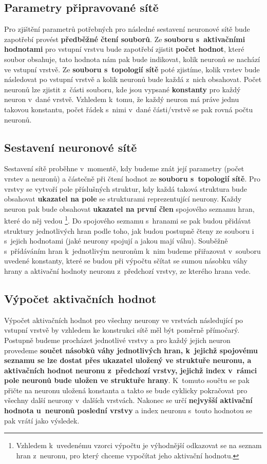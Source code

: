 \documentclass[11pt]{article}
\begin{document}
\subsection{Parametry připravované sítě}
Pro zjištění parametrů potřebných pro následné sestavení neuronové sítě bude zapotřebí provést \textbf{předběžné čtení souborů}. Ze \textbf{souboru s~aktivačními hodnotami} pro vstupní vrstvu bude zapotřebí zjistit \textbf{počet hodnot}, které soubor obsahuje, tato hodnota nám pak bude indikovat, kolik neuronů se nachází ve vstupní vrstvě. Ze \textbf{souboru s~topologií sítě} poté zjistíme, kolik vrstev bude následovat po vstupní vrstvě a kolik neuronů bude každá z~nich obsahovat. Počet neuronů lze zjistit z~části souboru, kde jsou vypsané \textbf{konstanty} pro každý neuron v~dané vrstvě. Vzhledem k~tomu, že každý neuron má práve jednu takovou konstantu, počet řádek s~nimi v~dané části/vrstvě se pak rovná počtu neuronů.

\subsection{Sestavení neuronové sítě}
Sestavení sítě proběhne v~momentě, kdy budeme znát její parametry (počet vrstev a neuronů) a částečně při čtení hodnot ze \textbf{souboru s~topologií sítě}. Pro vrstvy se vytvoří pole příslušných struktur, kdy každá taková struktura bude obsahovat \textbf{ukazatel na pole} se strukturami reprezentující neurony. Každy neuron pak bude obsahovat \textbf{ukazatel na první člen} spojového seznamu hran, které do něj vedou \footnote{Vzhledem k~uvedenému vzorci výpočtu je výhodnější odkazovat se na seznam hran z~neuronu, pro který chceme vypočítat jeho aktivační hodnotu.}. Do spojového seznamu s~hranami se pak budou přidávat struktury jednotlivých hran podle toho, jak budou postupně čteny ze souboru i s~jejich hodnotami (jaké neurony spojují a jakou mají váhu). Souběžně s~přídáváním hran k~jednotlivým neuronům k~nim budeme přiřazovat v~souboru uvedené konstanty, které se budou při výpočtu sčítat se sumou násobku váhy hrany a aktivační hodnoty neuronu z~předchozí vrstvy, ze kterého hrana vede.

\subsection{Výpočet aktivačních hodnot}
Výpočet aktivačních hodnot pro všechny neurony ve vrstvách následující po vstupní vrstvě by vzhledem ke konstrukci sítě měl být poměrně přímočarý. Postupně budeme procházet jednotlivé vrstvy a pro každý jejich neuron provedeme \textbf{součet násobků váhy jednotlivých hran, k~jejichž spojovému seznamu se lze dostat přes ukazatel uložený ve struktuře neuronu, a aktivačních hodnot neuronu z~předchozí vrstvy, jejichž index v~rámci pole neuronů bude uložen ve struktuře hrany}. K~tomuto součtu se pak přičte na neuronu uložená konstanta a takto se bude cyklicky pokračovat pro všechny další neurony v~dalších vrstvách. Nakonec se určí \textbf{nejvyšší aktivační hodnota u~neuronů poslední vrstvy} a index neuronu s~touto hodnotou se pak vrátí jako výsledek.
\end{document}
